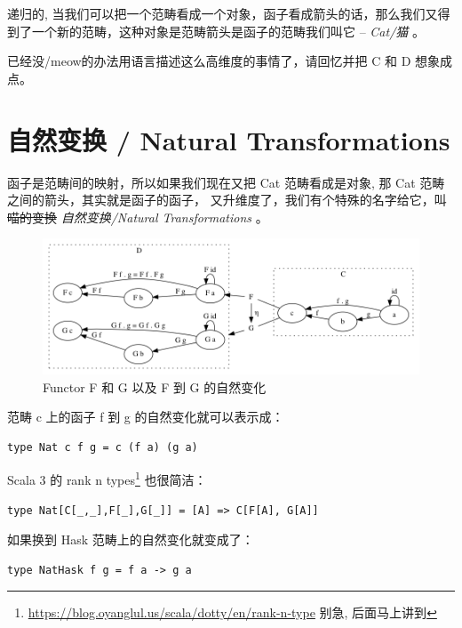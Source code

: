 \documentclass[letterspacing]{tufte-book}
\begin{document}
递归的, 当我们可以把一个范畴看成一个对象，函子看成箭头的话，那么我们又得到了一个新的范畴，这种对象是范畴箭头是函子的范畴我们叫它 -- \emph{Cat/猫} 。

已经没/meow的办法用语言描述这么高维度的事情了，请回忆\label{org0420545}并把 C 和 D 想象成点。

\chapter{自然变换 / Natural Transformations \label{org45b15a0}}
\label{sec:org7bc7d92}

函子是范畴间的映射，所以如果我们现在又把 Cat 范畴看成是对象, 那 Cat 范畴之间的箭头，其实就是函子的函子，
又升维度了，我们有个特殊的名字给它，叫 \sout{喵的变换} \emph{自然变换/Natural Transformations} 。

\begin{figure}[htbp]
\centering
\includegraphics[width=.9\linewidth]{images/natrual-transformation.png}
\caption[Functor G \(\eta\)]{Functor F 和 G 以及 F 到 G 的自然变化}
\end{figure}


范畴 c 上的函子 f 到 g 的自然变化就可以表示成：
\lstset{language=haskell,label= ,caption= ,captionpos=b,numbers=none}
\begin{lstlisting}
type Nat c f g = c (f a) (g a)
\end{lstlisting}

Scala 3 的 rank n types\footnote{\url{https://blog.oyanglul.us/scala/dotty/en/rank-n-type} 别急, 后面马上讲到} 也很简洁：
\lstset{language=scala,label= ,caption= ,captionpos=b,numbers=none}
\begin{lstlisting}
type Nat[C[_,_],F[_],G[_]] = [A] => C[F[A], G[A]]
\end{lstlisting}

如果换到 Hask 范畴上的自然变化就变成了：

\lstset{language=haskell,label= ,caption= ,captionpos=b,numbers=none}
\begin{lstlisting}
type NatHask f g = f a -> g a
\end{lstlisting}
\end{document}
